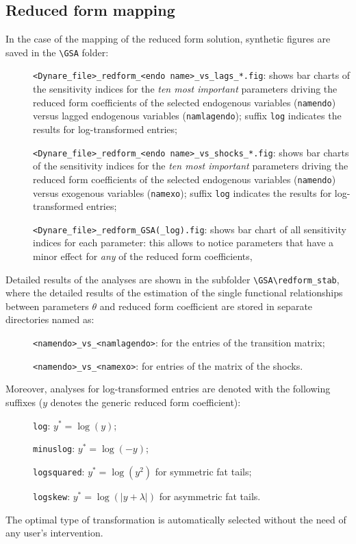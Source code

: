 \documentclass[12pt,a4paper]{article}
\begin{document}
\subsection{Reduced form mapping}
In the case of the mapping of the reduced form solution, synthetic
figures are saved in the \verb"\GSA" folder:

\begin{description}
\item[]\verb"<Dynare_file>_redform_<endo name>_vs_lags_*.fig":
shows bar charts of the sensitivity indices for the \emph{ten most
important} parameters driving the reduced form coefficients of the
selected endogenous variables (\verb"namendo") versus lagged
endogenous variables (\verb"namlagendo"); suffix \verb"log"
indicates the results for  log-transformed entries;
\item[]\verb"<Dynare_file>_redform_<endo name>_vs_shocks_*.fig":
shows bar charts of the sensitivity indices for the \emph{ten most
important} parameters driving the reduced form coefficients of the
selected endogenous variables (\verb"namendo") versus exogenous
variables (\verb"namexo"); suffix \verb"log" indicates the results
for  log-transformed entries;
\item[]\verb"<Dynare_file>_redform_GSA(_log).fig": shows bar chart of
all sensitivity indices for each  parameter: this allows to notice
parameters that have a minor effect for \emph{any} of the reduced
form coefficients,
\end{description}

Detailed results of the analyses are shown in the subfolder
\verb"\GSA\redform_stab", where the detailed results of the
estimation of the single functional relationships between
parameters $\theta$ and reduced form coefficient are stored in
separate directories named as:
\begin{description}
\item[]\verb"<namendo>_vs_<namlagendo>": for the entries of the
transition matrix;
\item[]\verb"<namendo>_vs_<namexo>": for entries of the matrix of
the shocks.
\end{description}
Moreover, analyses for log-transformed entries are denoted with
the following suffixes ($y$ denotes the generic reduced form
coefficient):
\begin{description}
\item[]\verb"log": $y^*=\log(y)$;
\item[]\verb"minuslog": $y^*=\log(-y)$;
\item[]\verb"logsquared": $y^*=\log(y^2)$ for symmetric fat tails;
\item[]\verb"logskew": $y^*=\log(|y+\lambda|)$ for asymmetric fat tails.
\end{description}
The optimal type of transformation is automatically selected
without the need of any user's intervention.
\end{document}
